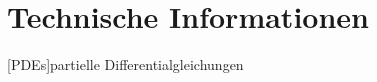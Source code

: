 \chapter{Technische Informationen}
\label{app:TechnischeInfos}
\begin{acronym}[PDE]
[PDEs]{partielle Differentialgleichungen}
\end{acronym}

\begin{acronym}[PD]
\end{acronym}

\begin{acronym}[SPD]
\end{acronym}

\begin{acronym}[RKHR]
\end{acronym}

\begin{acronym}[LGS]
\end{acronym}